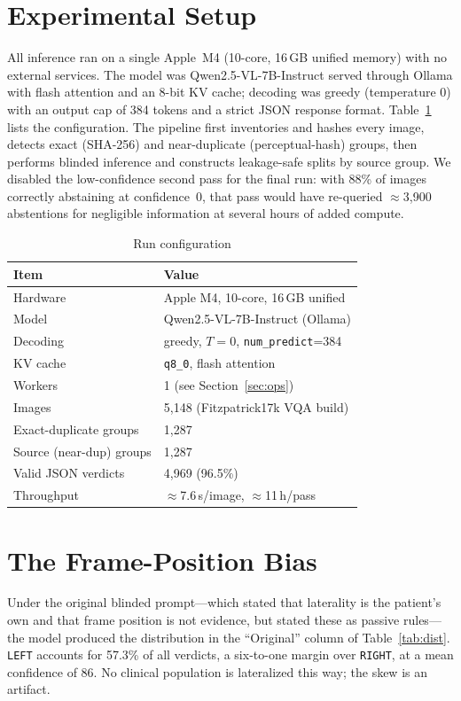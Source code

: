 \documentclass[conference]{IEEEtran}
\begin{document}
\section{Experimental Setup}\label{sec:setup}
All inference ran on a single Apple~M4 (10-core, 16\,GB unified memory) with no external services. The model was Qwen2.5-VL-7B-Instruct served through Ollama with flash attention and an 8-bit KV cache; decoding was greedy (temperature 0) with an output cap of 384 tokens and a strict JSON response format. Table~\ref{tab:config} lists the configuration. The pipeline first inventories and hashes every image, detects exact (SHA-256) and near-duplicate (perceptual-hash) groups, then performs blinded inference and constructs leakage-safe splits by source group. We disabled the low-confidence second pass for the final run: with 88\% of images correctly abstaining at confidence~0, that pass would have re-queried $\approx$3{,}900 abstentions for negligible information at several hours of added compute.

\begin{table}[!t]
\caption{Run configuration}
\label{tab:config}
\centering
\begin{tabular}{@{}ll@{}}
\toprule
Item & Value\\
\midrule
Hardware & Apple M4, 10-core, 16\,GB unified\\
Model & Qwen2.5-VL-7B-Instruct (Ollama)\\
Decoding & greedy, $T{=}0$, \texttt{num\_predict}=384\\
KV cache & \texttt{q8\_0}, flash attention\\
Workers & 1 (see Section~\ref{sec:ops})\\
Images & 5{,}148 (Fitzpatrick17k VQA build)\\
Exact-duplicate groups & 1{,}287\\
Source (near-dup) groups & 1{,}287\\
Valid JSON verdicts & 4{,}969 (96.5\%)\\
Throughput & $\approx$7.6\,s/image, $\approx$11\,h/pass\\
\bottomrule
\end{tabular}
\end{table}

\section{The Frame-Position Bias}\label{sec:bias}
Under the original blinded prompt---which stated that laterality is the patient's own and that frame position is not evidence, but stated these as passive rules---the model produced the distribution in the ``Original'' column of Table~\ref{tab:dist}. \texttt{LEFT} accounts for 57.3\% of all verdicts, a six-to-one margin over \texttt{RIGHT}, at a mean confidence of 86. No clinical population is lateralized this way; the skew is an artifact.
\end{document}
